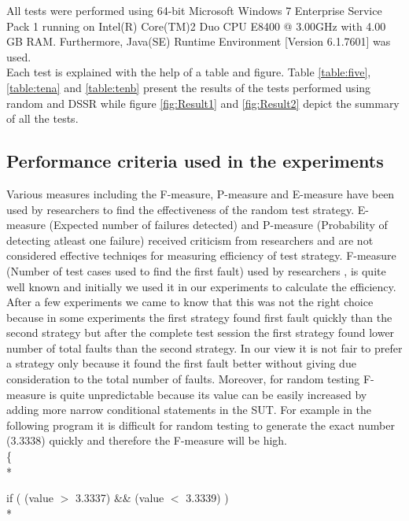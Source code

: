 \documentclass[10pt, conference, compsocconf]{IEEEtran}
\begin{document}
All tests were performed using 64-bit Microsoft Windows 7 Enterprise Service Pack 1 running on Intel(R) Core(TM)2 Duo CPU E8400 @ 3.00GHz with 4.00 GB RAM. Furthermore, Java(SE) Runtime Environment [Version 6.1.7601] was used.\\

Each test is explained with the help of a table and figure. Table \ref{table:five}, \ref{table:tena} and \ref{table:tenb} present the results of the tests performed using random and DSSR while figure \ref{fig:Result1} and \ref{fig:Result2} depict the summary of all the tests.



\subsection{Performance criteria used in the experiments}
Various measures including the F-measure, P-measure and E-measure have been used by researchers to find the effectiveness of the random test strategy. E-measure (Expected number of failures detected) and P-measure (Probability of detecting atleast one failure) received criticism from researchers \cite{Chen2008} and are not considered effective techniqes for measuring efficiency of test strategy. F-measure (Number of test cases used to find the first fault) used by researchers  \cite{Chen1996}, \cite{Chen2004} is quite well known and initially we used it in our experiments to calculate the efficiency. After a few experiments we came to know that this was not the right choice because in some experiments the first strategy found first fault quickly than the second strategy but after the complete test session the first strategy found lower number of total faults than the second strategy. In our view it is not fair to prefer a strategy only because it found the first fault better without giving due consideration to the total number of faults. Moreover, for random testing F-measure is quite unpredictable because its value can be easily increased by adding more narrow conditional statements in the SUT. For example in the following program it is difficult for random testing to generate the exact number (3.3338) quickly and therefore the F-measure will be high.\\

\{ \\*   

\hspace{07 mm}if ( (value $>$  3.3337) \&\& (value $<$ 3.3339) )\\*
\end{document}

